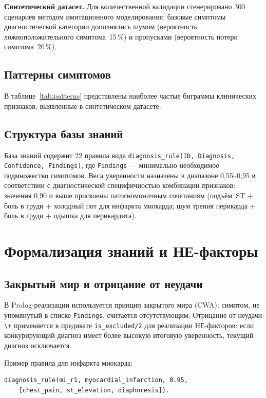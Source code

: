 \documentclass[14pt,a4paper]{extarticle}
\begin{document}
\textbf{Синтетический датасет.} Для количественной валидации сгенерировано 300 сценариев методом имитационного моделирования: базовые симптомы диагностической категории дополнялись шумом (вероятность ложноположительного симптома~15\,\%) и пропусками (вероятность потери симптома~20\,\%).

\subsection{Паттерны симптомов}

В таблице~\ref{tab:patterns} представлены наиболее частые биграммы клинических признаков, выявленные в синтетическом датасете.



\subsection{Структура базы знаний}

База знаний содержит 22 правила вида \texttt{diagnosis\_rule(ID, Diagnosis, Confidence, Findings)}, где \texttt{Findings} --- минимально необходимое подмножество симптомов. Веса уверенности назначены в диапазоне 0{,}55--0{,}95 в соответствии с диагностической специфичностью комбинации признаков: значения 0{,}90 и выше присвоены патогномоничным сочетаниям (подъём~ST + боль в груди + холодный пот для инфаркта миокарда; шум трения перикарда + боль в груди + одышка для перикардита).

\section{Формализация знаний и НЕ-факторы}

\subsection{Закрытый мир и отрицание от неудачи}

В Prolog-реализации используется принцип закрытого мира (CWA): симптом, не упомянутый в списке \texttt{Findings}, считается отсутствующим. Отрицание от неудачи \verb|\+| применяется в предикате \texttt{is\_excluded/2} для реализации НЕ-факторов: если конкурирующий диагноз имеет более высокую итоговую уверенность, текущий диагноз исключается.

Пример правила для инфаркта миокарда:
\begin{verbatim}
diagnosis_rule(mi_r1, myocardial_infarction, 0.95,
    [chest_pain, st_elevation, diaphoresis]).
\end{verbatim}
\end{document}
